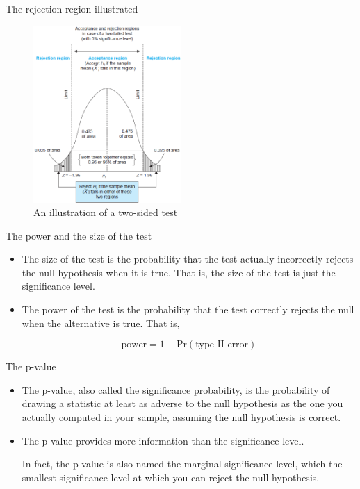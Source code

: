\documentclass[presentation]{beamer}
\begin{document}
\begin{frame}[label={sec:org8133735}]{The rejection region illustrated}
\begin{figure}[htbp]
\centering
\includegraphics[width=0.5\textwidth]{figure/fig9_1.png}
\caption{\label{fig:org6702ca2}
An illustration of a two-sided test}
\end{figure}
\end{frame}

\begin{frame}[label={sec:org277777d}]{The power and the size of the test}
\begin{itemize}
\item The \alert{size} of the test is the probability that the test actually
incorrectly rejects the null hypothesis when it is true. That is,
the size of the test is just the significance level.

\item The \alert{power} of the test is the probability that the test correctly
rejects the null when the alternative is true. That is,

\[\text{power} = 1 - \mathrm{Pr}(\text{type II error})\]
\end{itemize}
\end{frame}

\begin{frame}[label={sec:orgb7e3fd2}]{The p-value}
\begin{itemize}
\item The \alert{p-value}, also called the \alert{significance probability}, is the
probability of drawing a statistic at least as adverse to the null
hypothesis as the one you actually computed in your sample, assuming
the null hypothesis is correct.

\item The p-value provides more information than the significance level. 

In fact, the p-value is also named the marginal significance level,
which the smallest significance level at which you can reject the
null hypothesis.
\end{itemize}
\end{frame}
\end{document}
